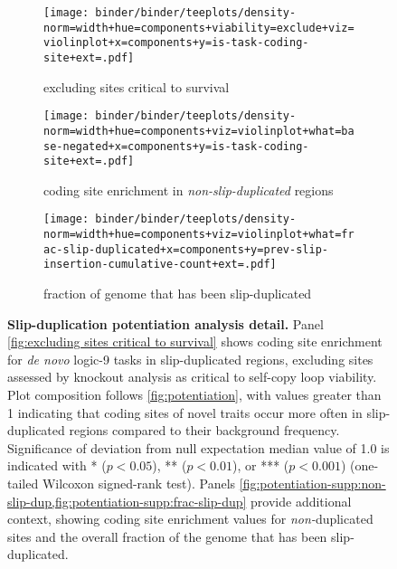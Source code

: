 \begin{figure*}

\begin{subfigure}{0.5\textwidth}
\texttt{[image: binder/binder/teeplots/density-norm=width+hue=components+viability=exclude+viz=violinplot+x=components+y=is-task-coding-site+ext=.pdf]}
\caption{%
\footnotesize
excluding sites critical to survival
}
\end{subfigure}%
\begin{subfigure}{0.5\textwidth}
\texttt{[image: binder/binder/teeplots/density-norm=width+hue=components+viz=violinplot+what=base-negated+x=components+y=is-task-coding-site+ext=.pdf]}
\caption{%
\footnotesize
coding site enrichment in \textit{non-slip-duplicated} regions
}
\label{fig:potentiation-supp:non-slip-dup}
\end{subfigure}

\begin{subfigure}{0.5\textwidth}
\texttt{[image: binder/binder/teeplots/density-norm=width+hue=components+viz=violinplot+what=frac-slip-duplicated+x=components+y=prev-slip-insertion-cumulative-count+ext=.pdf]}
\caption{%
\footnotesize
fraction of genome that has been slip-duplicated
}
\label{fig:potentiation-supp:frac-slip-dup}
\end{subfigure}

\caption{%
\textbf{Slip-duplication potentiation analysis detail.}
Panel \ref{fig:excluding sites critical to survival} shows coding site enrichment for \textit{de novo} logic-9 tasks in slip-duplicated regions, excluding sites assessed by knockout analysis as critical to self-copy loop viability.
Plot composition follows \ref{fig:potentiation}, with values greater than 1 indicating that coding sites of novel traits occur more often in slip-duplicated regions compared to their background frequency.
  Significance of deviation from null expectation median value of 1.0 is indicated with * ($p < 0.05$), ** ($p < 0.01$), or *** ($p < 0.001$) (one-tailed Wilcoxon signed-rank test).
  Panels \cref{fig:potentiation-supp:non-slip-dup,fig:potentiation-supp:frac-slip-dup} provide additional context, showing coding site enrichment values for \textit{non-}duplicated sites and the overall fraction of the genome that has been slip-duplicated.
}
\label{fig:potentiation-supp}
\end{figure*}
